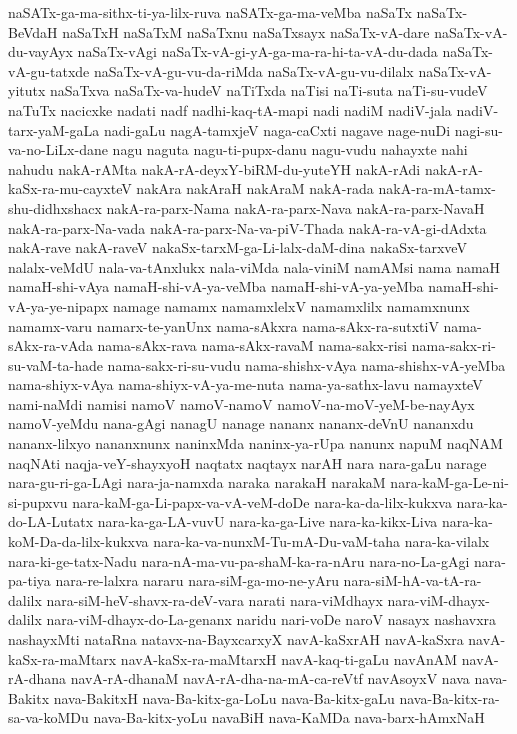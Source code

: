 {naSATx-ga-ma-sithx-ti-ya-lilx-ruva
naSATx-ga-ma-veMba
naSaTx
naSaTx-BeVdaH
naSaTxH
naSaTxM
naSaTxnu
naSaTxsayx
naSaTx-vA-dare
naSaTx-vA-du-vayAyx
naSaTx-vAgi
naSaTx-vA-gi-yA-ga-ma-ra-hi-ta-vA-du-dada
naSaTx-vA-gu-tatxde
naSaTx-vA-gu-vu-da-riMda
naSaTx-vA-gu-vu-dilalx
naSaTx-vA-yitutx
naSaTxva
naSaTx-va-hudeV
naTiTxda
naTisi
naTi-suta
naTi-su-vudeV
naTuTx
nacicxke
nadati
nadf
nadhi-kaq-tA-mapi
nadi
nadiM
nadiV-jala
nadiV-tarx-yaM-gaLa
nadi-gaLu
nagA-tamxjeV
naga-caCxti
nagave
nage-nuDi
nagi-su-va-no-LiLx-dane
nagu
naguta
nagu-ti-pupx-danu
nagu-vudu
nahayxte
nahi
nahudu
nakA-rAMta
nakA-rA-deyxY-biRM-du-yuteYH
nakA-rAdi
nakA-rA-kaSx-ra-mu-cayxteV
nakAra
nakAraH
nakAraM
nakA-rada
nakA-ra-mA-tamx-shu-didhxshacx
nakA-ra-parx-Nama
nakA-ra-parx-Nava
nakA-ra-parx-NavaH
nakA-ra-parx-Na-vada
nakA-ra-parx-Na-va-piV-Thada
nakA-ra-vA-gi-dAdxta
nakA-rave
nakA-raveV
nakaSx-tarxM-ga-Li-lalx-daM-dina
nakaSx-tarxveV
nalalx-veMdU
nala-va-tAnxlukx
nala-viMda
nala-viniM
namAMsi
nama
namaH
namaH-shi-vAya
namaH-shi-vA-ya-veMba
namaH-shi-vA-ya-yeMba
namaH-shi-vA-ya-ye-nipapx
namage
namamx
namamxlelxV
namamxlilx
namamxnunx
namamx-varu
namarx-te-yanUnx
nama-sAkxra
nama-sAkx-ra-sutxtiV
nama-sAkx-ra-vAda
nama-sAkx-rava
nama-sAkx-ravaM
nama-sakx-risi
nama-sakx-ri-su-vaM-ta-hade
nama-sakx-ri-su-vudu
nama-shishx-vAya
nama-shishx-vA-yeMba
nama-shiyx-vAya
nama-shiyx-vA-ya-me-nuta
nama-ya-sathx-lavu
namayxteV
nami-naMdi
namisi
namoV
namoV-namoV
namoV-na-moV-yeM-be-nayAyx
namoV-yeMdu
nana-gAgi
nanagU
nanage
nananx
nananx-deVnU
nananxdu
nananx-lilxyo
nananxnunx
naninxMda
naninx-ya-rUpa
nanunx
napuM
naqNAM
naqNAti
naqja-veY-shayxyoH
naqtatx
naqtayx
narAH
nara
nara-gaLu
narage
nara-gu-ri-ga-LAgi
nara-ja-namxda
naraka
narakaH
narakaM
nara-kaM-ga-Le-ni-si-pupxvu
nara-kaM-ga-Li-papx-va-vA-veM-doDe
nara-ka-da-lilx-kukxva
nara-ka-do-LA-Lutatx
nara-ka-ga-LA-vuvU
nara-ka-ga-Live
nara-ka-kikx-Liva
nara-ka-koM-Da-da-lilx-kukxva
nara-ka-va-nunxM-Tu-mA-Du-vaM-taha
nara-ka-vilalx
nara-ki-ge-tatx-Nadu
nara-nA-ma-vu-pa-shaM-ka-ra-nAru
nara-no-La-gAgi
nara-pa-tiya
nara-re-lalxra
nararu
nara-siM-ga-mo-ne-yAru
nara-siM-hA-va-tA-ra-dalilx
nara-siM-heV-shavx-ra-deV-vara
narati
nara-viMdhayx
nara-viM-dhayx-dalilx
nara-viM-dhayx-do-La-genanx
naridu
nari-voDe
naroV
nasayx
nashavxra
nashayxMti
nataRna
natavx-na-BayxcarxyX
navA-kaSxrAH
navA-kaSxra
navA-kaSx-ra-maMtarx
navA-kaSx-ra-maMtarxH
navA-kaq-ti-gaLu
navAnAM
navA-rA-dhana
navA-rA-dhanaM
navA-rA-dha-na-mA-ca-reVtf
navAsoyxV
nava
nava-Bakitx
nava-BakitxH
nava-Ba-kitx-ga-LoLu
nava-Ba-kitx-gaLu
nava-Ba-kitx-ra-sa-va-koMDu
nava-Ba-kitx-yoLu
navaBiH
nava-KaMDa
nava-barx-hAmxNaH
}
